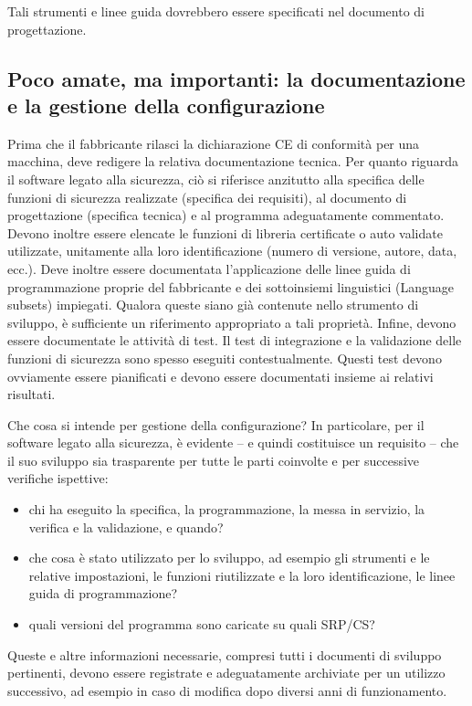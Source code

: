Tali strumenti e linee guida dovrebbero essere specificati nel documento di progettazione.

\subsection{Poco amate, ma importanti: la documentazione e la gestione della configurazione}
\label{subsec:06-3-8}
Prima che il fabbricante rilasci la dichiarazione CE di conformità per una macchina, deve redigere la relativa documentazione tecnica. Per quanto riguarda il software legato alla sicurezza, ciò si riferisce anzitutto alla specifica delle funzioni di sicurezza realizzate (specifica dei requisiti), al documento di progettazione (specifica tecnica) e al programma adeguatamente commentato. Devono inoltre essere elencate le funzioni di libreria certificate o auto validate utilizzate, unitamente alla loro identificazione (numero di versione, autore, data, ecc.). Deve inoltre essere documentata l'applicazione delle linee guida di programmazione proprie del fabbricante e dei sottoinsiemi linguistici (Language subsets) impiegati. Qualora queste siano già contenute nello strumento di sviluppo, è sufficiente un riferimento appropriato a tali proprietà. Infine, devono essere documentate le attività di test. Il test di integrazione e la validazione delle funzioni di sicurezza sono spesso eseguiti contestualmente. Questi test devono ovviamente essere pianificati e devono essere documentati insieme ai relativi risultati.

Che cosa si intende per gestione della configurazione? In particolare, per il software legato alla sicurezza, è evidente – e quindi costituisce un requisito – che il suo sviluppo sia trasparente per tutte le parti coinvolte e per successive verifiche ispettive:
\begin{itemize}
    \item chi ha eseguito la specifica, la programmazione, la messa in servizio, la verifica e la validazione, e quando?
    \item che cosa è stato utilizzato per lo sviluppo, ad esempio gli strumenti e le relative impostazioni, le funzioni riutilizzate e la loro identificazione, le linee guida di programmazione?
    \item quali versioni del programma sono caricate su quali SRP/CS?
\end{itemize}

Queste e altre informazioni necessarie, compresi tutti i documenti di sviluppo pertinenti, devono essere registrate e adeguatamente archiviate per un utilizzo successivo, ad esempio in caso di modifica dopo diversi anni di funzionamento.

